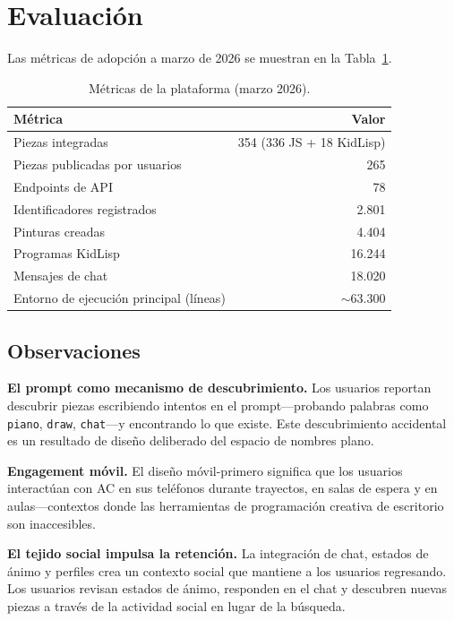 \documentclass[10pt,letterpaper,twocolumn]{article}
\begin{document}
\section{Evaluación}
\label{sec:evaluation}

Las métricas de adopción a marzo de 2026 se muestran en la Tabla~\ref{tab:adoption}.

\begin{table}[h]
\small
\centering
\begin{tabular}{lr}
\toprule
\textbf{Métrica} & \textbf{Valor} \\
\midrule
Piezas integradas & 354 (336 JS + 18 KidLisp) \\
Piezas publicadas por usuarios & 265 \\
Endpoints de API & 78 \\
Identificadores registrados & 2.801 \\
Pinturas creadas & 4.404 \\
Programas KidLisp & 16.244 \\
Mensajes de chat & 18.020 \\
Entorno de ejecución principal (líneas) & $\sim$63.300 \\
\bottomrule
\end{tabular}
\caption{Métricas de la plataforma (marzo 2026).}
\label{tab:adoption}
\end{table}

\subsection{Observaciones}

\textbf{El prompt como mecanismo de descubrimiento.} Los usuarios reportan descubrir piezas escribiendo intentos en el prompt---probando palabras como \texttt{piano}, \texttt{draw}, \texttt{chat}---y encontrando lo que existe. Este descubrimiento accidental es un resultado de diseño deliberado del espacio de nombres plano.

\textbf{Engagement móvil.} El diseño móvil-primero significa que los usuarios interactúan con AC en sus teléfonos durante trayectos, en salas de espera y en aulas---contextos donde las herramientas de programación creativa de escritorio son inaccesibles.

\textbf{El tejido social impulsa la retención.} La integración de chat, estados de ánimo y perfiles crea un contexto social que mantiene a los usuarios regresando. Los usuarios revisan estados de ánimo, responden en el chat y descubren nuevas piezas a través de la actividad social en lugar de la búsqueda.
\end{document}

